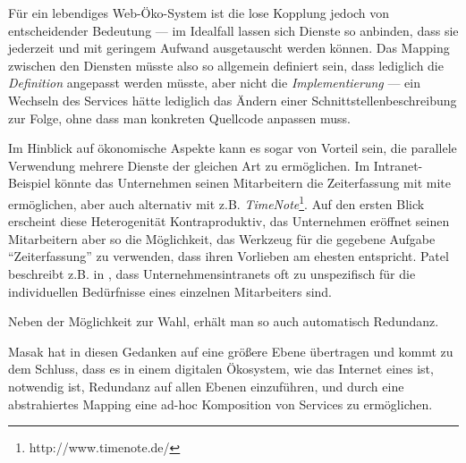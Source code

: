 \label{l:intro-loosecoupling}Für ein lebendiges Web-Öko-System ist die lose Kopplung jedoch von entscheidender Bedeutung --- im Idealfall lassen sich Dienste so anbinden, dass sie jederzeit und mit geringem Aufwand ausgetauscht werden können. Das Mapping zwischen den Diensten müsste also so allgemein definiert sein, dass lediglich die \emph{Definition} angepasst werden müsste, aber nicht die \emph{Implementierung} --- ein Wechseln des Services hätte lediglich das Ändern einer Schnittstellenbeschreibung zur Folge, ohne dass man konkreten Quellcode anpassen muss.

Im Hinblick auf ökonomische Aspekte kann es sogar von Vorteil sein, die parallele Verwendung mehrere Dienste der gleichen Art zu ermöglichen. Im Intranet-Beispiel könnte das Unternehmen seinen Mitarbeitern die Zeiterfassung mit \ac{mite} ermöglichen, aber auch alternativ mit z.B. \emph{TimeNote}\footnote{http://www.timenote.de/}. Auf den ersten Blick erscheint diese Heterogenität Kontraproduktiv, das Unternehmen eröffnet seinen Mitarbeitern aber so die Möglichkeit, das Werkzeug für die gegebene Aufgabe "`Zeiterfassung"' zu verwenden, dass ihren  Vorlieben am ehesten entspricht. Patel beschreibt z.B. in \cite{pl-depintra}, dass Unternehmensintranets oft zu unspezifisch für die individuellen Bedürfnisse eines einzelnen Mitarbeiters sind.

Neben der Möglichkeit zur Wahl, erhält man so auch automatisch Redundanz.

Masak hat in \cite{mkulss} diesen Gedanken auf eine größere Ebene übertragen und kommt zu dem Schluss, dass es in einem digitalen Ökosystem, wie das Internet eines ist, notwendig ist, Redundanz auf allen Ebenen einzuführen, und durch eine abstrahiertes Mapping eine ad-hoc Komposition von Services zu ermöglichen.

